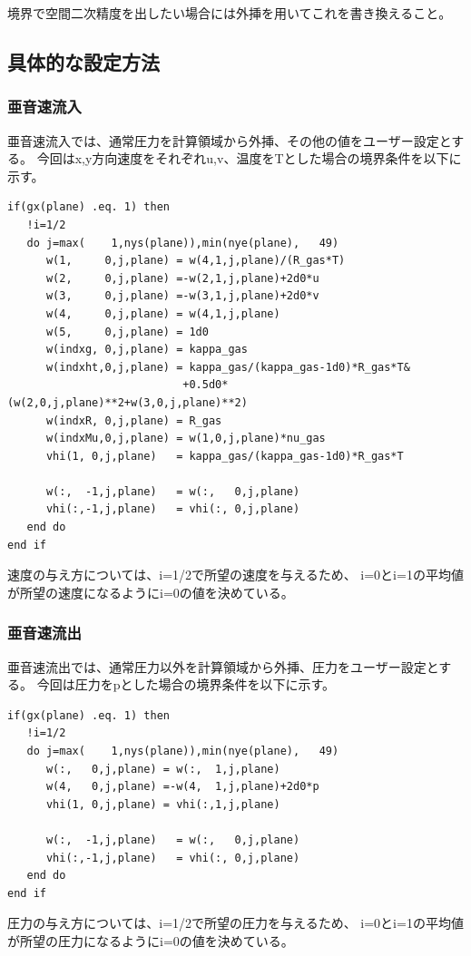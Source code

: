 \documentclass{jsarticle}
\begin{document}
境界で空間二次精度を出したい場合には外挿を用いてこれを書き換えること。
\subsection{具体的な設定方法}%
\subsubsection{亜音速流入}%
亜音速流入では、通常圧力を計算領域から外挿、その他の値をユーザー設定とする。
今回はx,y方向速度をそれぞれu,v、温度をTとした場合の境界条件を以下に示す。
\begin{verbatim}
if(gx(plane) .eq. 1) then
   !i=1/2
   do j=max(    1,nys(plane)),min(nye(plane),   49)
      w(1,     0,j,plane) = w(4,1,j,plane)/(R_gas*T)
      w(2,     0,j,plane) =-w(2,1,j,plane)+2d0*u
      w(3,     0,j,plane) =-w(3,1,j,plane)+2d0*v
      w(4,     0,j,plane) = w(4,1,j,plane)
      w(5,     0,j,plane) = 1d0
      w(indxg, 0,j,plane) = kappa_gas
      w(indxht,0,j,plane) = kappa_gas/(kappa_gas-1d0)*R_gas*T&
                           +0.5d0*(w(2,0,j,plane)**2+w(3,0,j,plane)**2)
      w(indxR, 0,j,plane) = R_gas
      w(indxMu,0,j,plane) = w(1,0,j,plane)*nu_gas
      vhi(1, 0,j,plane)   = kappa_gas/(kappa_gas-1d0)*R_gas*T

      w(:,  -1,j,plane)   = w(:,   0,j,plane) 
      vhi(:,-1,j,plane)   = vhi(:, 0,j,plane) 
   end do
end if
\end{verbatim}
速度の与え方については、i=1/2で所望の速度を与えるため、
i=0とi=1の平均値が所望の速度になるようにi=0の値を決めている。
\subsubsection{亜音速流出}%
亜音速流出では、通常圧力以外を計算領域から外挿、圧力をユーザー設定とする。
今回は圧力をpとした場合の境界条件を以下に示す。
\begin{verbatim}
if(gx(plane) .eq. 1) then
   !i=1/2
   do j=max(    1,nys(plane)),min(nye(plane),   49)
      w(:,   0,j,plane) = w(:,  1,j,plane)
      w(4,   0,j,plane) =-w(4,  1,j,plane)+2d0*p
      vhi(1, 0,j,plane) = vhi(:,1,j,plane)

      w(:,  -1,j,plane)   = w(:,   0,j,plane) 
      vhi(:,-1,j,plane)   = vhi(:, 0,j,plane) 
   end do
end if
\end{verbatim}
圧力の与え方については、i=1/2で所望の圧力を与えるため、
i=0とi=1の平均値が所望の圧力になるようにi=0の値を決めている。
\end{document}
